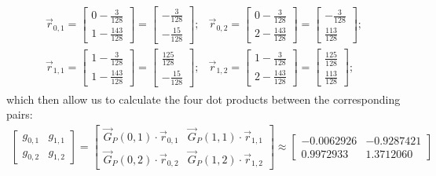 \begin{align*}
    \begin{matrix}
        \vec{r}_{0,1}=
        \begin{bmatrix}
            0-\frac{3}{128} \\
            1-\frac{143}{128}
        \end{bmatrix}
        =
        \begin{bmatrix}
            -\frac{3}{128} \\
            -\frac{15}{128}
        \end{bmatrix}; & 
        \vec{r}_{0,2}=
        \begin{bmatrix}
            0-\frac{3}{128} \\
            2-\frac{143}{128}
        \end{bmatrix}
        =
        \begin{bmatrix}
            -\frac{3}{128} \\
            \frac{113}{128}
        \end{bmatrix}; \\
        \vec{r}_{1,1}=
        \begin{bmatrix}
            1-\frac{3}{128} \\
            1-\frac{143}{128}
        \end{bmatrix}
        =
        \begin{bmatrix}
            \frac{125}{128} \\
            -\frac{15}{128}
        \end{bmatrix}; & 
        \vec{r}_{1,2}=
        \begin{bmatrix}
            1-\frac{3}{128} \\
            2-\frac{143}{128}
        \end{bmatrix}
        =
        \begin{bmatrix}
            \frac{125}{128} \\
            \frac{113}{128}
        \end{bmatrix};
    \end{matrix}
\end{align*}
which then allow us to calculate the four dot products between the corresponding pairs:
\begin{align*}
    \begin{bmatrix}
        g_{0,1} & g_{1,1} \\
        g_{0,2} & g_{1,2}
    \end{bmatrix}
    =
    \begin{bmatrix}
        \vec{G}_P(0,1)\cdot\vec{r}_{0,1} & \vec{G}_P(1,1)\cdot\vec{r}_{1,1}\\
        \vec{G}_P(0,2)\cdot\vec{r}_{0,2} & \vec{G}_P(1,2)\cdot\vec{r}_{1,2}
    \end{bmatrix}
    \approx
    \begin{bmatrix}
        -0.0062926 & -0.9287421 \\
        0.9972933 & 1.3712060
    \end{bmatrix}
\end{align*}
